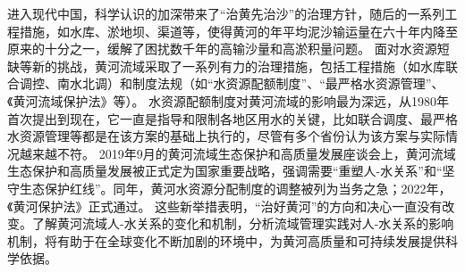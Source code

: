 进入现代中国，科学认识的加深带来了“治黄先治沙”的治理方针，随后的一系列工程措施，如水库、淤地坝、渠道等，使得黄河的年平均泥沙输运量在六十年内降至原来的十分之一，缓解了困扰数千年的高输沙量和高淤积量问题\cite{wang2016a}。
面对水资源短缺等新的挑战，黄河流域采取了一系列有力的治理措施，包括工程措施（如水库联合调控、南水北调）和制度法规（如“水资源配额制度”、“最严格水资源管理”、《黄河流域保护法》等）\cite{shuilibuhuangheshuiliweiyuanhui2010}。
水资源配额制度对黄河流域的影响最为深远，从1980年首次提出到现在，它一直是指导和限制各地区用水的关键，比如联合调度、最严格水资源管理等都是在该方案的基础上执行的，尽管有多个省份认为该方案与实际情况越来越不符\cite{wang2019b,wang2019e}。
2019年9月的黄河流域生态保护和高质量发展座谈会上，黄河流域生态保护和高质量发展被正式定为国家重要战略，强调需要“重塑人-水关系”和“坚守生态保护红线”。同年，黄河水资源分配制度的调整被列为当务之急；2022年，《黄河保护法》正式通过\cite{lu2019,dongzhanfeng2020}。
这些新举措表明，“治好黄河”的方向和决心一直没有改变。了解黄河流域人-水关系的变化和机制，分析流域管理实践对人-水关系的影响机制，将有助于在全球变化不断加剧的环境中，为黄河高质量和可持续发展提供科学依据。
